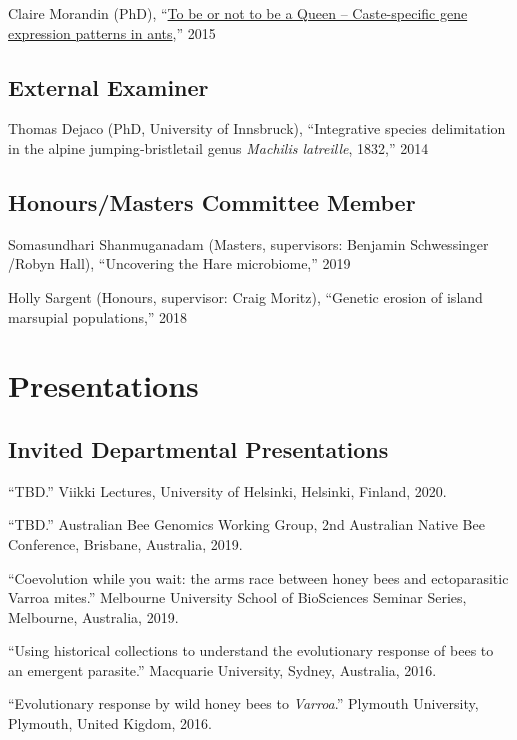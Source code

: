 \documentclass[11pt]{article}
\def\printdate#1{\xprintdate#1-}
\def\xprintdate#1-#2-#3-{#1}
\begin{document}
\ind Claire Morandin (PhD), ``\href{https://pdfs.semanticscholar.org/ce84/0a0475d80c276d36c4e6f6fa7a00d0f3524c.pdf}{To be or not to be a Queen -- Caste-specific gene expression patterns in
ants},'' 2015

\subsection{External Examiner}
\ind Thomas Dejaco (PhD, University of Innsbruck), ``Integrative species delimitation in the alpine jumping‐bristletail genus
\textit{Machilis latreille}, 1832,'' 2014

\subsection{Honours/Masters Committee Member}
\ind Somasundhari Shanmuganadam (Masters, supervisors: Benjamin Schwessinger /Robyn Hall), ``Uncovering the Hare microbiome,'' 2019

\ind Holly Sargent (Honours, supervisor: Craig Moritz), ``Genetic erosion of island marsupial populations,'' 2018


\section{Presentations}

\subsection{Invited Departmental Presentations}


\ind ``TBD.'' Viikki Lectures, University of Helsinki, Helsinki, Finland, \printdate{2020-00-00}.


\ind ``TBD.'' Australian Bee Genomics Working Group, 2nd Australian Native Bee
Conference, Brisbane, Australia, \printdate{2019-12-00}.


\ind ``Coevolution while you wait: the arms race between honey bees and
ectoparasitic Varroa mites.'' Melbourne University School of BioSciences Seminar Series, Melbourne, Australia, \printdate{2019-00-00}.








\ind ``Using historical collections to understand the evolutionary response of
bees to an emergent parasite.'' Macquarie University, Sydney, Australia, \printdate{2016-00-00}.


\ind ``Evolutionary response by wild honey bees to \textit{Varroa}.'' Plymouth University, Plymouth, United Kigdom, \printdate{2016-00-00}.
\end{document}
